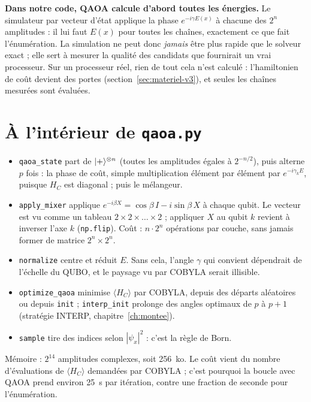 \begin{piege}
\textbf{Dans notre code, QAOA calcule d'abord toutes les énergies.} Le simulateur par vecteur d'état applique la phase $e^{-i\gamma E(x)}$ à chacune des $2^n$ amplitudes : il lui faut $E(x)$ pour toutes les chaînes, exactement ce que fait l'énumération. La simulation ne peut donc \emph{jamais} être plus rapide que le solveur exact ; elle sert à mesurer la qualité des candidats que fournirait un vrai processeur. Sur un processeur réel, rien de tout cela n'est calculé : l'hamiltonien de coût devient des portes (section~\ref{sec:materiel-v3}), et seules les chaînes mesurées sont évaluées.
\end{piege}

\section{À l'intérieur de \texttt{qaoa.py}}
\begin{itemize}
\item \texttt{qaoa\_state} part de $\lvert +\rangle^{\otimes n}$ (toutes les amplitudes égales à $2^{-n/2}$), puis alterne $p$ fois : la phase de coût, simple multiplication élément par élément par $e^{-i\gamma_kE}$, puisque $H_C$ est diagonal ; puis le mélangeur.
\item \texttt{apply\_mixer} applique $e^{-i\beta X}=\cos\beta\,I-i\sin\beta\,X$ à chaque qubit. Le vecteur est vu comme un tableau $2\times2\times\dots\times2$ ; appliquer $X$ au qubit $k$ revient à inverser l'axe $k$ (\texttt{np.flip}). Coût : $n\cdot2^n$ opérations par couche, sans jamais former de matrice $2^n\times2^n$.
\item \texttt{normalize} centre et réduit $E$. Sans cela, l'angle $\gamma$ qui convient dépendrait de l'échelle du QUBO, et le paysage vu par COBYLA serait illisible.
\item \texttt{optimize\_qaoa} minimise $\langle H_C\rangle$ par COBYLA, depuis des départs aléatoires ou depuis \texttt{init} ; \texttt{interp\_init} prolonge des angles optimaux de $p$ à $p+1$ (stratégie INTERP, chapitre~\ref{ch:montee}).
\item \texttt{sample} tire des indices selon $|\psi_x|^2$ : c'est la règle de Born.
\end{itemize}
Mémoire : $2^{14}$ amplitudes complexes, soit 256~ko. Le coût vient du nombre d'évaluations de $\langle H_C\rangle$ demandées par COBYLA ; c'est pourquoi la boucle avec QAOA prend environ 25~s par itération, contre une fraction de seconde pour l'énumération.

